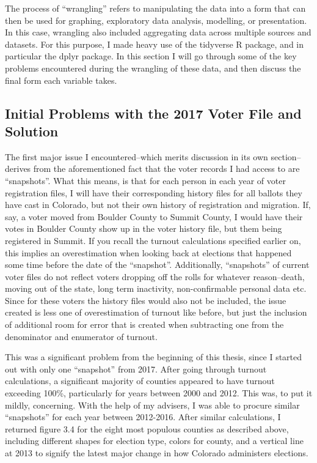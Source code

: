 \documentclass[12pt,twoside]{reedthesis}
\begin{document}
  The process of ``wrangling'' refers to manipulating the data into a form
  that can then be used for graphing, exploratory data analysis,
  modelling, or presentation. In this case, wrangling also included
  aggregating data across multiple sources and datasets. For this purpose,
  I made heavy use of the tidyverse R package, and in particular the dplyr
  package. In this section I will go through some of the key problems
  encountered during the wrangling of these data, and then discuss the
  final form each variable takes.
  
  \subsection{Initial Problems with the 2017 Voter File and
  Solution}\label{initial-problems-with-the-2017-voter-file-and-solution}
  
  The first major issue I encountered--which merits discussion in its own
  section--derives from the aforementioned fact that the voter records I
  had access to are ``snapshots''. What this means, is that for each
  person in each year of voter registration files, I will have their
  corresponding history files for all ballots they have cast in Colorado,
  but not their own history of registration and migration. If, say, a
  voter moved from Boulder County to Summit County, I would have their
  votes in Boulder County show up in the voter history file, but them
  being registered in Summit. If you recall the turnout calculations
  specified earlier on, this implies an overestimation when looking back
  at elections that happened some time before the date of the
  ``snapshot''. Additionally, ``snapshots'' of current voter files do not
  reflect voters dropping off the rolls for whatever reason--death, moving
  out of the state, long term inactivity, non-confirmable personal data
  etc. Since for these voters the history files would also not be
  included, the issue created is less one of overestimation of turnout
  like before, but just the inclusion of additional room for error that is
  created when subtracting one from the denominator and enumerator of
  turnout.
  
  This was a significant problem from the beginning of this thesis, since
  I started out with only one ``snapshot'' from 2017. After going through
  turnout calculations, a significant majority of counties appeared to
  have turnout exceeding 100\%, particularly for years between 2000 and
  2012. This was, to put it mildly, concerning. With the help of my
  advisers, I was able to procure similar ``snapshots'' for each year
  between 2012-2016. After similar calculations, I returned figure 3.4 for
  the eight most populous counties as described above, including different
  shapes for election type, colors for county, and a vertical line at 2013
  to signify the latest major change in how Colorado administers
  elections.
  
\end{document}
